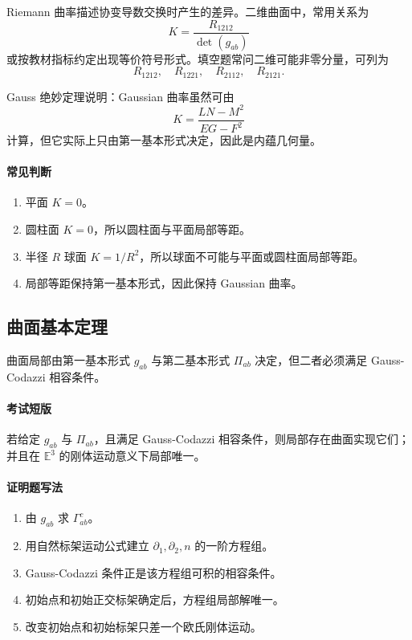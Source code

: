 \documentclass[UTF8,12pt,a4paper]{ctexart}
\newcommand{\E}{\mathbb E}
\begin{document}
Riemann 曲率描述协变导数交换时产生的差异。二维曲面中，常用关系为
\[
K=\frac{R_{1212}}{\det(g_{ab})}
\]
或按教材指标约定出现等价符号形式。填空题常问二维可能非零分量，可列为
\[
R_{1212},\quad R_{1221},\quad R_{2112},\quad R_{2121}.
\]

Gauss 绝妙定理说明：Gaussian 曲率虽然可由
\[
K=\frac{LN-M^2}{EG-F^2}
\]
计算，但它实际上只由第一基本形式决定，因此是内蕴几何量。

\paragraph{常见判断}
\begin{enumerate}
\item 平面 $K=0$。
\item 圆柱面 $K=0$，所以圆柱面与平面局部等距。
\item 半径 $R$ 球面 $K=1/R^2$，所以球面不可能与平面或圆柱面局部等距。
\item 局部等距保持第一基本形式，因此保持 Gaussian 曲率。
\end{enumerate}

\subsection{曲面基本定理}

曲面局部由第一基本形式 $g_{ab}$ 与第二基本形式 $\Pi_{ab}$ 决定，但二者必须满足 Gauss-Codazzi 相容条件。

\paragraph{考试短版}
若给定 $g_{ab}$ 与 $\Pi_{ab}$，且满足 Gauss-Codazzi 相容条件，则局部存在曲面实现它们；并且在 $\E^3$ 的刚体运动意义下局部唯一。

\paragraph{证明题写法}
\begin{enumerate}
\item 由 $g_{ab}$ 求 $\Gamma^c_{ab}$。
\item 用自然标架运动公式建立 $\partial_1,\partial_2,n$ 的一阶方程组。
\item Gauss-Codazzi 条件正是该方程组可积的相容条件。
\item 初始点和初始正交标架确定后，方程组局部解唯一。
\item 改变初始点和初始标架只差一个欧氏刚体运动。
\end{enumerate}
\end{document}

